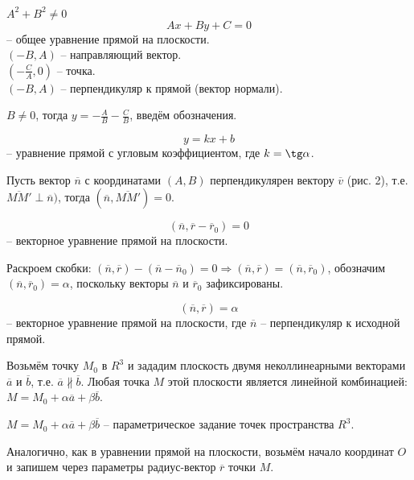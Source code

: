 	\begin{Def}
		$A^2 + B^2 \neq 0$
		$$Ax + By + C = 0$$ -- общее уравнение прямой на плоскости. \\
		$(-B, A)$ -- направляющий вектор.\\
		$(-\frac{C}{A}, 0)$ -- точка.\\
		$(-B, A)$ -- перпендикуляр к прямой (вектор нормали). 
	\end{Def}

	$B \neq 0$, тогда $y = -\frac{A}{B} - \frac{C}{B}$, введём обозначения.
	\begin{Def}
		$$y = kx + b$$ -- уравнение прямой с угловым коэффициентом, где $k = \tg \alpha$.
	\end{Def}

	Пусть вектор $\overline{n}$ с координатами $(A,B)$ перпендикулярен вектору  $\overline{v}$ (рис. 2), т.е. $\overline{MM'} \perp \overline{n})$, тогда $(\overline{n}, \overline{MM'}) = 0$.

	\begin{Def}
		$$(\overline{n}, \overline{r} - \overline{r}_0) = 0$$ -- векторное уравнение прямой на плоскости.
	\end{Def}

	Раскроем скобки: $(\overline{n}, \overline{r}) - (\overline{n} - \overline{n}_0) = 0 \Rightarrow (\overline{n}, \overline{r}) = (\overline{n}, \overline{r}_0)$, обозначим $(\overline{n}, \overline{r}_0) = \alpha$, поскольку векторы $\overline{n}$ и $\overline{r}_0$ зафиксированы.

	\begin{Def}
		$$(\overline{n}, \overline{r}) = \alpha$$ -- векторное уравнение прямой на плоскости, где $\overline{n}$ -- перпендикуляр к исходной прямой.
	\end{Def}

	
	Возьмём точку $M_0$ в $R^3$ и зададим плоскость двумя неколлинеарными векторами $\overline{a}$ и $\overline{b}$, т.е. $\overline{a} \nparallel \overline{b}$. Любая точка $M$ этой плоскости является линейной комбинацией: $M = M_0 + \alpha \overline{a} + \beta \overline{b}$.
	
	\begin{Def}
		$M = M_0 + \alpha \overline{a}  + \beta \overline{b}$ -- параметрическое задание точек пространства $R^3$.
	\end{Def}
	
	Аналогично, как в уравнении прямой на плоскости, возьмём начало координат $O$ и запишем через параметры радиус-вектор $\overline{r}$ точки $M$.

